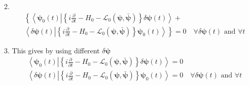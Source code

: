 \documentclass[aps,preprint]{revtex4}%
\begin{document}
2.
\begin{align}
&  \left\{  \left\langle \mathbf{\psi}_{0}\left(  t\right)  \left\vert
\left\{  i\frac{\partial}{\partial t}-H_{0}-\mathcal{L}_{0}\left(
\mathbf{\psi},\mathbf{\bar{\psi}}\right)  \right\}  \delta\mathbf{\psi}\left(
t\right)  \right.  \right\rangle \right.  +\nonumber\\
&  \left.  \left\langle \delta\mathbf{\psi}\left(  t\right)  \left\vert
\left\{  i\frac{\partial}{\partial t}-H_{0}-\mathcal{L}_{0}\left(
\mathbf{\psi},\mathbf{\bar{\psi}}\right)  \right\}  \right.  \mathbf{\psi}%
_{0}\left(  t\right)  \right\rangle \right\}  =0\quad\forall\delta
\mathbf{\psi}\left(  t\right)  \text{ and }\forall t
\end{align}


3. This gives by using different $\delta\mathbf{\psi}$
\begin{align}
&  \left\langle \mathbf{\psi}_{0}\left(  t\right)  \left\vert \left\{
i\frac{\partial}{\partial t}-H_{0}-\mathcal{L}_{0}\left(  \mathbf{\psi
},\mathbf{\bar{\psi}}\right)  \right\}  \delta\mathbf{\psi}\left(  t\right)
\right.  \right\rangle =0\nonumber\\
&  \left\langle \delta\mathbf{\psi}\left(  t\right)  \left\vert \left\{
i\frac{\partial}{\partial t}-H_{0}-\mathcal{L}_{0}\left(  \mathbf{\psi
},\mathbf{\bar{\psi}}\right)  \right\}  \right.  \mathbf{\psi}_{0}\left(
t\right)  \right\rangle =0\quad\forall\delta\mathbf{\psi}\left(  t\right)
\text{ and }\forall t
\end{align}
\end{document}
